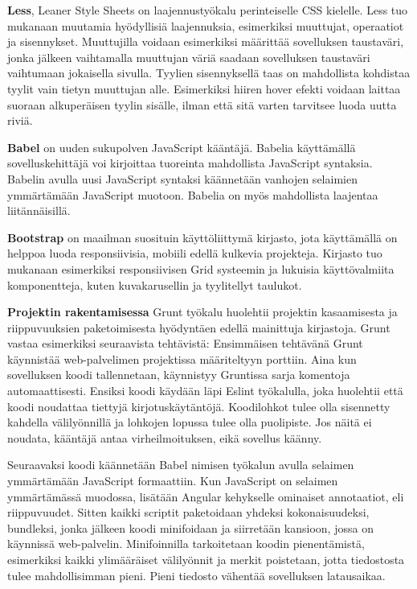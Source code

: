 \documentclass{tktltiki}
\begin{document}
\textbf{Less}, Leaner Style Sheets on laajennustyökalu perinteiselle CSS kielelle. Less tuo mukanaan muutamia hyödyllisiä laajennuksia, esimerkiksi muuttujat, operaatiot ja sisennykset. Muuttujilla voidaan esimerkiksi määrittää sovelluksen taustaväri, jonka jälkeen vaihtamalla muuttujan väriä saadaan sovelluksen taustaväri vaihtumaan jokaisella sivulla. Tyylien sisennyksellä taas on mahdollista kohdistaa tyylit vain tietyn muuttujan alle. Esimerkiksi hiiren hover efekti voidaan laittaa suoraan alkuperäisen tyylin sisälle, ilman että sitä varten tarvitsee luoda uutta riviä.

\textbf{Babel} on uuden sukupolven JavaScript kääntäjä. Babelia käyttämällä sovelluskehittäjä voi kirjoittaa tuoreinta mahdollista JavaScript syntaksia. Babelin avulla uusi JavaScript syntaksi käännetään vanhojen selaimien ymmärtämään JavaScript muotoon. Babelia on myös mahdollista laajentaa liitännäisillä.

\textbf{Bootstrap} on maailman suosituin käyttöliittymä kirjasto, jota käyttämällä on helppoa luoda responsiivisia, mobiili edellä kulkevia projekteja. Kirjasto tuo mukanaan esimerkiksi responsiivisen Grid systeemin ja lukuisia käyttövalmiita komponentteja, kuten kuvakarusellin ja tyylitellyt taulukot. 

\textbf{Projektin rakentamisessa} Grunt työkalu huolehtii projektin kasaamisesta ja riippuvuuksien paketoimisesta hyödyntäen edellä mainittuja kirjastoja. Grunt vastaa esimerkiksi seuraavista tehtävistä: Ensimmäisen tehtävänä Grunt käynnistää web-palvelimen projektissa määriteltyyn porttiin. Aina kun sovelluksen koodi tallennetaan, käynnistyy Gruntissa sarja komentoja automaattisesti. Ensiksi koodi käydään läpi Eslint työkalulla, joka huolehtii että koodi noudattaa tiettyjä kirjotuskäytäntöjä. Koodilohkot tulee olla sisennetty kahdella välilyönnillä ja lohkojen lopussa tulee olla puolipiste. Jos näitä ei noudata, kääntäjä antaa virheilmoituksen, eikä sovellus käänny. 

Seuraavaksi koodi käännetään Babel nimisen työkalun avulla selaimen ymmärtämään JavaScript formaattiin. Kun JavaScript on selaimen ymmärtämässä muodossa, lisätään Angular kehykselle ominaiset annotaatiot, eli riippuvuudet. Sitten kaikki scriptit paketoidaan yhdeksi kokonaisuudeksi, bundleksi, jonka jälkeen koodi minifoidaan ja siirretään kansioon, jossa on käynnissä web-palvelin. Minifoinnilla tarkoitetaan koodin pienentämistä, esimerkiksi kaikki ylimääräiset välilyönnit ja merkit poistetaan, jotta tiedostosta tulee mahdollisimman pieni. Pieni tiedosto vähentää sovelluksen latausaikaa.
\end{document}
